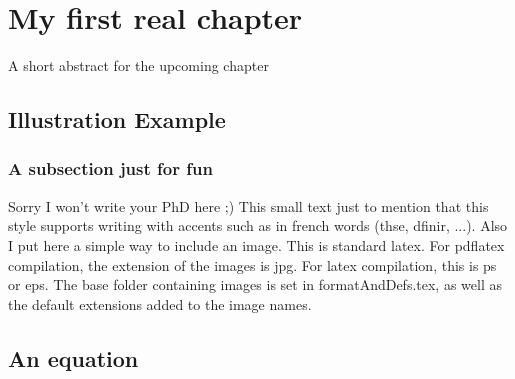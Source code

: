 \chapter{My first real chapter}
\label{chap:intro}
\begin{shortAbstract}
A short abstract for the upcoming chapter
\end{shortAbstract}


\section{Illustration Example}

\subsection{A subsection just for fun}

Sorry I won't write your PhD here ;) This small text just to mention that this style supports writing with accents such as in french words (thse, dfinir, ...). Also I put here a simple way to include an image. This is standard latex. For pdflatex compilation, the extension of the images is jpg. For latex compilation, this is ps or eps. The base folder containing images is set in formatAndDefs.tex, as well as the default extensions added to the image names.

\section{An equation}

